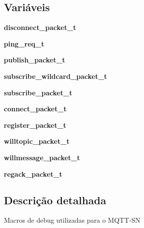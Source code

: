 \subsection*{Variáveis}
\begin{DoxyCompactItemize}
\item 
\hypertarget{group__Pacotes_ga1bdd22cd8ef2662e484e03ebdae7c970}{{\bfseries disconnect\+\_\+packet\+\_\+t}}\label{group__Pacotes_ga1bdd22cd8ef2662e484e03ebdae7c970}

\item 
\hypertarget{group__Pacotes_gaaa5b26ddb66cc7e85a9f4b30881775f2}{{\bfseries ping\+\_\+req\+\_\+t}}\label{group__Pacotes_gaaa5b26ddb66cc7e85a9f4b30881775f2}

\item 
\hypertarget{group__Pacotes_ga1f5bdda25ae963bb270e8a301b201b51}{{\bfseries publish\+\_\+packet\+\_\+t}}\label{group__Pacotes_ga1f5bdda25ae963bb270e8a301b201b51}

\item 
\hypertarget{group__Pacotes_gad20a7c29debd43f1bb693ea71cf25f37}{{\bfseries subscribe\+\_\+wildcard\+\_\+packet\+\_\+t}}\label{group__Pacotes_gad20a7c29debd43f1bb693ea71cf25f37}

\item 
\hypertarget{group__Pacotes_gad1653d1eb1e0b157ee553f5e18e837e3}{{\bfseries subscribe\+\_\+packet\+\_\+t}}\label{group__Pacotes_gad1653d1eb1e0b157ee553f5e18e837e3}

\item 
\hypertarget{group__Pacotes_gac7e9bb2727332431de0ed82739b64a37}{{\bfseries connect\+\_\+packet\+\_\+t}}\label{group__Pacotes_gac7e9bb2727332431de0ed82739b64a37}

\item 
\hypertarget{group__Pacotes_ga504f9ba055b5a5a51a852c85ba691d2f}{{\bfseries register\+\_\+packet\+\_\+t}}\label{group__Pacotes_ga504f9ba055b5a5a51a852c85ba691d2f}

\item 
\hypertarget{group__Pacotes_ga10d9b05d37a49ef4473051eb8cd9062e}{{\bfseries willtopic\+\_\+packet\+\_\+t}}\label{group__Pacotes_ga10d9b05d37a49ef4473051eb8cd9062e}

\item 
\hypertarget{group__Pacotes_ga498ec637bb31754407eaf35a3c0b3b4b}{{\bfseries willmessage\+\_\+packet\+\_\+t}}\label{group__Pacotes_ga498ec637bb31754407eaf35a3c0b3b4b}

\item 
\hypertarget{group__Pacotes_ga35c8d1d4849e06b6cd1a59b1d86b8368}{{\bfseries regack\+\_\+packet\+\_\+t}}\label{group__Pacotes_ga35c8d1d4849e06b6cd1a59b1d86b8368}

\end{DoxyCompactItemize}


\subsection{Descrição detalhada}
Macros de debug utilizadas para o M\+Q\+T\+T-\/\+S\+N 